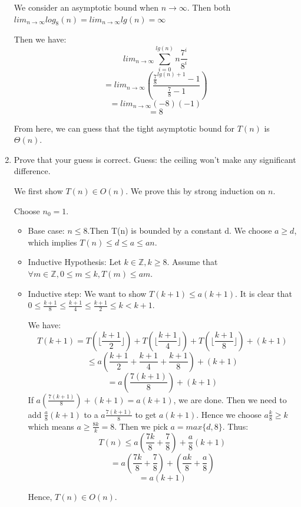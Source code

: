 \documentclass{cpsc413Solutions}
\begin{document}
\begin{problemlist}
\begin{problem}
\begin{answer}
\begin{enumerate}
    We consider an asymptotic bound when $n \xrightarrow{}\infty$. Then both $lim_{n\xrightarrow{}\infty}log_8(n) = lim_{n\xrightarrow{}\infty}lg(n) = \infty$
    
    Then we have:
    $$lim_{n\xrightarrow {}\infty} \sum_{i=0}^{lg(n)}n\frac{7^i}{8^i}$$
    $$= lim_{n\xrightarrow {}\infty} (\frac{\frac{7}{8}^{lg(n)+1}-1}{\frac{7}{8}-1})$$
    $$= lim_{n\xrightarrow {}\infty} (-8) (-1)$$
    $$=8$$
    
    From here, we can guess that the tight asymptotic bound for $T(n)$ is $\Theta(n)$.
    
\newpage
    \item Prove that your guess is correct.
    Guess: the ceiling won't make any significant difference.
    
    We first show $T(n) \in O(n)$. We prove this by strong induction on $n$. 
    
    Choose $n_0 = 1$.
    
    \begin{itemize}
        \item
        Base case: $n \leq 8$.Then T(n) is bounded by a constant d. We choose $a \geq d$, which implies $T(n) \leq d \leq a \leq an$.
        
        \item Inductive Hypothesis: Let $k \in \mathds{Z}, k \geq 8$. Assume that $\forall m \in \mathds{Z},0\leq m \leq k,T(m) \leq am$.
        
        \item Inductive step: We want to show $T(k+1) \leq a(k+1)$. It is clear that $0 \leq \frac{k+1}{8} \leq \frac{k+1}{4} \leq \frac{k+1}{2} \leq k < k+1$.
        
        We have:\\
        $$T(k+1) = T(\lfloor\frac{k+1}{2}\rfloor) + T(\lfloor\frac{k+1}{4}\rfloor) + T(\lfloor\frac{k+1}{8}\rfloor) + (k+1)$$
        $$\leq a (\frac{k+1}{2}+\frac{k+1}{4}+\frac{k+1}{8}) + (k+1)$$
        $$= a (\frac{7(k+1)}{8})+(k+1)$$
        If $a (\frac{7(k+1)}{8})+(k+1) = a(k+1)$, we are done. Then we need to add $\frac{a}{8}(k+1)$ to a $a\frac{7(k+1)}{8}$ to get $a(k+1)$. Hence we choose $a\frac{k}{8}\geq k$ which means $a \geq \frac{8k}{k}= 8$. Then we pick $a = max \{d,8\}$. Thus:
        $$T(n) \leq a (\frac{7k}{8}+\frac{7}{8})+\frac{a}{8}(k+1)$$
        $$= a (\frac{7k}{8}+\frac{7}{8})+(\frac{ak}{8}+\frac{a}{8})$$
        $$= a(k+1)$$
        
        Hence, $T(n) \in O(n)$.\\
    \end{itemize}
    

\end{enumerate}
\end{answer}
\end{problem}
\end{problemlist}
\end{document}
